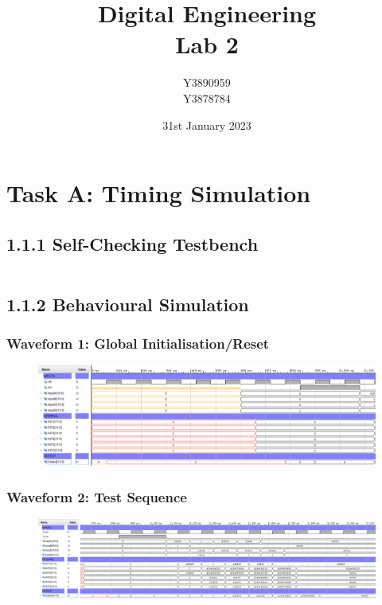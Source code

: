 \documentclass[11pt]{report}
\title{Digital Engineering\\Lab 2}
\author{Y3890959\\Y3878784}
\date{31st January 2023}
\begin{document}
\maketitle

\chapter*{Task A: Timing Simulation}

\section*{1.1.1 Self-Checking Testbench}
\inputminted{vhdl}{../../Lab2/Lab2.srcs/sim_1/new/algorithm_tb.vhd}

\section*{1.1.2 Behavioural Simulation}
\subsection*{Waveform 1: Global Initialisation/Reset}
\begin{figure}[H]
    \includegraphics[width=\columnwidth]{Reports/Lab2/Waveforms/120ns_behavioural_global-reset.png}
\end{figure}
\subsection*{Waveform 2: Test Sequence}
\begin{figure}[H]
    \includegraphics[width=\columnwidth]{Reports/Lab2/Waveforms/120ns_behavioural_test-sequence.png}
\end{figure}
\end{document}
